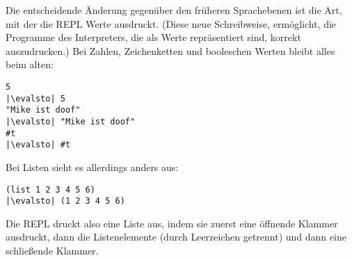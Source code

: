 Die entscheidende Änderung gegenüber den früheren Sprachebenen ist
die Art, mit der die REPL Werte ausdruckt.  (Diese neue Schreibweise,
ermöglicht, die Programme des Interpreters, die als Werte
repräsentiert sind, korrekt auszudrucken.)  Bei Zahlen, Zeichenketten
und booleschen Werten bleibt alles beim alten:
%
\begin{lstlisting}
5
|\evalsto| 5
"Mike ist doof"
|\evalsto| "Mike ist doof"
#t
|\evalsto| #t
\end{lstlisting}
%
Bei Listen sieht es allerdings anders aus:
%
\begin{lstlisting}
(list 1 2 3 4 5 6)
|\evalsto| (1 2 3 4 5 6)
\end{lstlisting}
%
Die REPL druckt also eine Liste aus, indem sie zuerst eine öffnende
Klammer ausdruckt, dann die Listenelemente (durch Leerzeichen
getrennt) und dann eine schließende Klammer.

